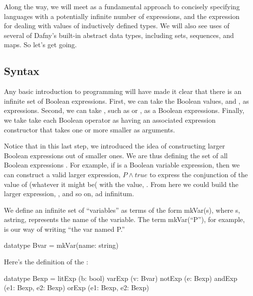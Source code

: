 \documentclass[letterpaper,10pt,english]{sphinxmanual}
\begin{document}
Along the way, we will meet  as a fundamental
approach to concisely specifying languages with a potentially infinite
number of expressions, and the  expression for dealing with
values of inductively defined types. We will also see uses of several
of Dafny’s built-in abstract data types, including sets, sequences,
and maps. So let’s get going.


\subsection{Syntax}
\label{\detokenize{09-propositional-logic:syntax}}
Any basic introduction to programming will have made it clear that
there is an infinite set of Boolean expressions. First, we can take
the Boolean values,  and , as  expressions.
Second, we can take , such as  or , as a
Boolean  expressions. Finally, we take take each Boolean
operator as having an associated expression constructor that takes one
or more smaller  as arguments.

Notice that in this last step, we introduced the idea of constructing
larger Boolean expressions out of smaller ones. We are thus defining
the set of all Boolean expressions . For example, if 
is a Boolean variable expression, then we can construct a valid larger
expression, \(P \land true\) to express the conjunction of the
value of  (whatever it might be( with the value, . From here
we could build the larger expression, , and so
on, ad infinitum.

We define an infinite set of “variables” as terms of the form
mkVar(s), where s, astring, represents the name of the variable. The
term mkVar(“P”), for example, is our way of writing “the var named P.”

\begin{sphinxVerbatim}[commandchars=\\\{\}]
datatype Bvar = mkVar(name: string)
\end{sphinxVerbatim}

Here’s the definition of the :

\begin{sphinxVerbatim}[commandchars=\\\{\}]
datatype Bexp =
    litExp (b: bool) \textbar{}
    varExp (v: Bvar) \textbar{}
    notExp (e: Bexp) \textbar{}
    andExp (e1: Bexp, e2: Bexp) \textbar{}
    orExp (e1: Bexp, e2: Bexp)
\end{sphinxVerbatim}
\end{document}
